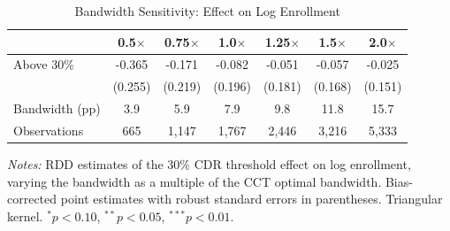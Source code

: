 \begin{table}[t]
\centering
\caption{Bandwidth Sensitivity: Effect on Log Enrollment}
\label{tab:bw_sensitivity}
\begin{tabular}{lcccccc}
\toprule
& 0.5$\times$ & 0.75$\times$ & 1.0$\times$ & 1.25$\times$ & 1.5$\times$ & 2.0$\times$ \\
\midrule
Above 30\% & -0.365 & -0.171 & -0.082 & -0.051 & -0.057 & -0.025 \\
 & (0.255) & (0.219) & (0.196) & (0.181) & (0.168) & (0.151) \\
\midrule
Bandwidth (pp) & 3.9 & 5.9 & 7.9 & 9.8 & 11.8 & 15.7 \\
Observations & 665 & 1,147 & 1,767 & 2,446 & 3,216 & 5,333 \\
\bottomrule
\end{tabular}
\begin{minipage}{0.95\textwidth}
\vspace{0.5em}\footnotesize
\textit{Notes:} RDD estimates of the 30\% CDR threshold effect on log enrollment, varying the bandwidth as a multiple of the CCT optimal bandwidth. Bias-corrected point estimates with robust standard errors in parentheses. Triangular kernel. $^{*}p<0.10$, $^{**}p<0.05$, $^{***}p<0.01$.
\end{minipage}
\end{table}
